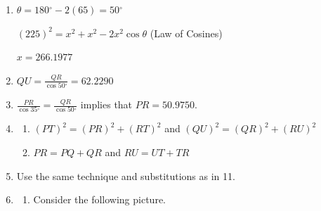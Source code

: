 \documentclass[english]{book}
\newcommand{\degrees}{\ensuremath{^{\circ}}}
\begin{document}
\begin{enumerate}[\hspace{1cm}1)]
\begin{enumerate}[\hspace{1cm}a)]
              $2 \theta + \alpha = 90 \degrees$ implies that $\alpha = 90 \degrees - 2 \theta$. Hence, we have $\phi = 90 \degrees - \theta$, $\delta = 90 \degrees - \theta$, $\beta = 2 \theta$, $\gamma = 90 \degrees + \theta$, and $d = 90 \degrees - 2 \theta$.
          \item Now note that $x+y=5$, so that $y=5-x$.
          \item Using the Law of Cosines, $x^{2} = 3^{2} + 4^{2} - 2(3)(4) \cos \alpha$, or $x^{2} = 25 - 24 \cos (90 \degrees - 2 \theta)$.
          \item Note that the outer triangle is a right triangle. Hence, $\cos \theta = \frac{4}{5}$ and $\sin \theta = \frac{3}{5}$.
          \item Hence, $x = 1.4$ and $y = 3.6$.
        \end{enumerate}
  \item $\theta = 180 \degrees - 2(65) = 50 \degrees$

      $(225)^{2} = x^{2} + x^{2} - 2x^{2} \cos \theta$ (Law of Cosines)

      $x = 266.1977$
  \item $QU = \frac{QR}{\cos 50 \degrees} = 62.2290$
  \item $\frac{PR}{\cos 35 \degrees}=\frac{QR}{\cos 50 \degrees}$ implies that $PR=50.9750$.
  \item \begin{enumerate}[\hspace{1cm}a)]
          \item $(PT)^{2} = (PR)^{2} + (RT)^{2}$ and $(QU)^{2} = (QR)^{2} + (RU)^{2}$
          \item $PR = PQ+QR$ and $RU = UT+TR$
        \end{enumerate}
  \item Use the same technique and substitutions as in 11.
  \item \begin{enumerate}[\hspace{1cm}a)]
          \item Consider the following picture.
        \end{enumerate}
\end{enumerate}
\end{document}

